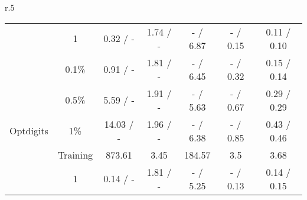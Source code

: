 \begin{wraptable}[23]{r}{.5\textwidth}
{\begin{tabular}{ccccccc}
                                                     & 1                               & 0.32 / -                                                            & 1.74 / -                                                         & - / 6.87                                                              & - / 0.15                                                              & 0.11 / 0.10                        \\
                                                     & 0.1\%                           & 0.91 / -                                                            & 1.81 / -                                                         & - / 6.45                                                              & - / 0.32                                                              & 0.15 / 0.14                        \\
                                                     & 0.5\%                           & 5.59 / -                                                            & 1.91 / -                                                         & - / 5.63                                                              & - / 0.67                                                              & 0.29 / 0.29                        \\
\multirow{-5}{*}{Optdigits}                          & 1\%                             & 14.03 / -                                                           & 1.96 / -                                                         & - / 6.38                                                              & - / 0.85                                                              & 0.43 / 0.46                        \\\midrule
                                                     & Training                        & 873.61                                                              & 3.45                                                             & 184.57                                                                & 3.5                                                                   & 3.68                               \\
                                                     & 1                               & 0.14 / -                                                            & 1.81 / -                                                         & - / 5.25                                                              & - / 0.13                                                              & 0.14 / 0.15                        \\

\end{tabular}}
\end{wraptable}
